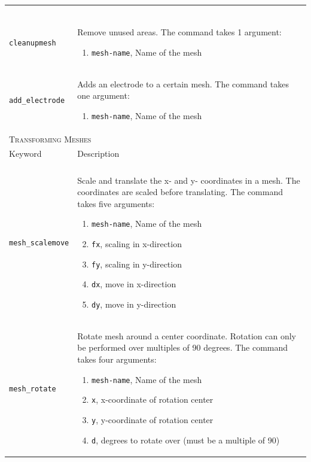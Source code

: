 \documentclass[noshowpacs,preprintnumbers,amsmath,amssymb, letter]{revtex4}
\begin{document}
\begin{longtable}{p{}p{}}
\begin{enumerate}
\end{enumerate}\\
\texttt{cleanupmesh}	& Remove unused areas. The command takes 1 argument:
\begin{enumerate}
\item \texttt{mesh-name}, Name of the mesh
\end{enumerate}\\
\texttt{add\_electrode}	& Adds an electrode to a certain mesh. The command takes one argument:
\begin{enumerate}
\item \texttt{mesh-name}, Name of the mesh
\end{enumerate}\\
\multicolumn{2}{l}{\textsc{Transforming Meshes}} \\*
\hline
Keyword & Description \\
\hline\\
\texttt{mesh\_scalemove} 	& Scale and translate the x- and y- coordinates in a mesh. The coordinates are scaled before translating. The command takes five arguments:
\begin{enumerate}
\item \texttt{mesh-name}, Name of the mesh
\item \texttt{fx}, scaling in x-direction
\item \texttt{fy}, scaling in y-direction
\item \texttt{dx}, move in x-direction
\item \texttt{dy}, move in y-direction
\end{enumerate}\\
\texttt{mesh\_rotate} 	& Rotate mesh around a center coordinate. Rotation can only be performed over multiples of 90 degrees. The command takes four arguments:
\begin{enumerate}
\item \texttt{mesh-name}, Name of the mesh
\item \texttt{x}, x-coordinate of rotation center
\item \texttt{y}, y-coordinate of rotation center
\item \texttt{d}, degrees to rotate over (must be a multiple of 90)

\end{enumerate}
\end{longtable}
\end{document}
